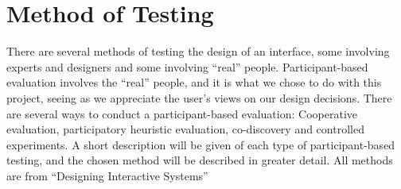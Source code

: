 \section{Method of Testing}
There are several methods of testing the design of an interface, some involving experts and designers and some involving ``real'' people. Participant-based evaluation involves the ``real'' people, and it is what we chose to do with this project, seeing as we appreciate the user's views on our design decisions. There are several ways to conduct a participant-based evaluation: Cooperative evaluation, participatory heuristic evaluation, co-discovery and controlled experiments. A short description will be given of each type of participant-based testing, and the chosen method will be described in greater detail.
All methods are from ``Designing Interactive Systems''\cite{Benyon10}



